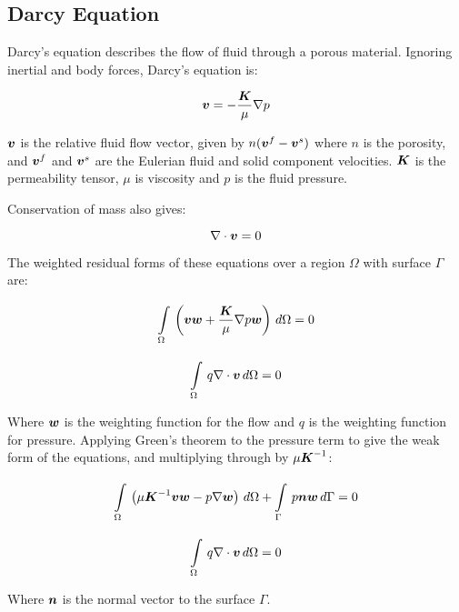 \subsection{Darcy Equation}

Darcy's equation describes the flow of fluid through a porous material. Ignoring inertial
and body forces, Darcy's equation is:

\begin{equation}
\vect{v} = -\frac{\tensor{K}}{\mu} \gradient p
\end{equation}

$\vect{v}$ is the relative fluid flow vector, given by $n (\vect{v}^f - \vect{v}^s)$ where
$n$ is the porosity, and $\vect{v}^f$ and $\vect{v}^s$ are the
Eulerian fluid and solid component velocities.
$\boldsymbol{K}$ is the permeability tensor, $\mu$ is viscosity
and $p$ is the fluid pressure.

Conservation of mass also gives:

\begin{equation}
\gradient \cdot \vect{v} = 0
\end{equation}

The weighted residual forms of these equations over a region $\Omega$ with surface $\Gamma$ are:

\begin{equation}
\gint{\Omega}{}{\left(\vect{v} \vect{w} + \frac{\tensor{K}}{\mu} \gradient p \vect{w}\right)}{\Omega} = 0
\end{equation}

\begin{equation}
\gint{\Omega}{}{q \gradient \cdot \vect{v}}{\Omega} = 0
\end{equation}

Where $\vect{w}$ is the weighting function for the flow and $q$ is the weighting function
for pressure.
Applying Green's theorem to the pressure term to give the weak form of the equations, and multiplying through by
$\mu \boldsymbol{K}^{-1}$:

\begin{equation}
  \gint{\Omega}{}{\left(\mu \tensor{K}^{-1} \vect{v} \vect{w} - p \gradient \vect{w}\right)}{\Omega}  + %
  \gint{\Gamma}{}{p \vect{n} \vect{w}}{\Gamma}= 0
\end{equation}

\begin{equation}
  \gint{\Omega}{}{q \gradient \cdot \vect{v}}{\Omega}= 0
\end{equation}

Where $\vect{n}$ is the normal vector to the surface $\Gamma$.

